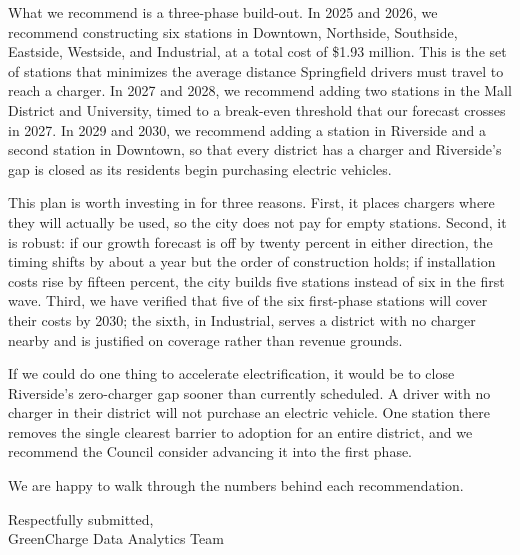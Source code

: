 \documentclass[11pt]{article}
\begin{document}
What we recommend is a three-phase build-out. In 2025 and 2026, we recommend constructing six stations in Downtown, Northside, Southside, Eastside, Westside, and Industrial, at a total cost of \$1.93 million. This is the set of stations that minimizes the average distance Springfield drivers must travel to reach a charger. In 2027 and 2028, we recommend adding two stations in the Mall District and University, timed to a break-even threshold that our forecast crosses in 2027. In 2029 and 2030, we recommend adding a station in Riverside and a second station in Downtown, so that every district has a charger and Riverside's gap is closed as its residents begin purchasing electric vehicles.

This plan is worth investing in for three reasons. First, it places chargers where they will actually be used, so the city does not pay for empty stations. Second, it is robust: if our growth forecast is off by twenty percent in either direction, the timing shifts by about a year but the order of construction holds; if installation costs rise by fifteen percent, the city builds five stations instead of six in the first wave. Third, we have verified that five of the six first-phase stations will cover their costs by 2030; the sixth, in Industrial, serves a district with no charger nearby and is justified on coverage rather than revenue grounds.

If we could do one thing to accelerate electrification, it would be to close Riverside's zero-charger gap sooner than currently scheduled. A driver with no charger in their district will not purchase an electric vehicle. One station there removes the single clearest barrier to adoption for an entire district, and we recommend the Council consider advancing it into the first phase.

We are happy to walk through the numbers behind each recommendation.

\vspace{8pt}
\noindent Respectfully submitted,\\
GreenCharge Data Analytics Team
\end{document}
